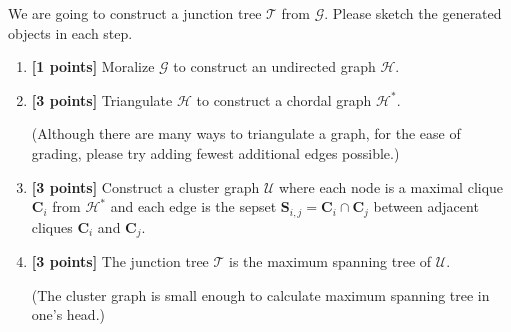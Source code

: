 \documentclass{article}
\newcommand{\Gcal}{\mathcal{G}}
\newcommand{\Hcal}{\mathcal{H}}
\newcommand{\Ucal}{\mathcal{U}}
\newcommand{\Tcal}{\mathcal{T}}
\newcommand{\Cbs}{\boldsymbol{C}}
\newcommand{\Sbs}{\boldsymbol{S}}
\begin{document}
We are going to construct a junction tree $ \Tcal $ from $ \Gcal $.
Please sketch the generated objects in each step.

\begin{enumerate}
\item \textbf{[1 points]} Moralize $ \Gcal $ to construct an undirected graph $ \Hcal $.





\item \textbf{[3 points]} Triangulate $ \Hcal $ to construct a chordal graph $ \Hcal^* $. 

(Although there are many ways to triangulate a graph, for the ease of grading, please try adding fewest additional edges possible.)






\item \textbf{[3 points]} Construct a cluster graph $ \Ucal $ where each node is a maximal clique $ \Cbs_i $ from $ \Hcal^* $ and each edge is the sepset $ \Sbs_{i,j} = \Cbs_i \cap \Cbs_j $ between adjacent cliques $ \Cbs_i $ and $ \Cbs_j $. 





\item \textbf{[3 points]} 
The junction tree $ \Tcal $ is the maximum spanning tree of $ \Ucal $. 

(The cluster graph is small enough to calculate maximum spanning tree in one's head.)





\end{enumerate}
\end{document}
